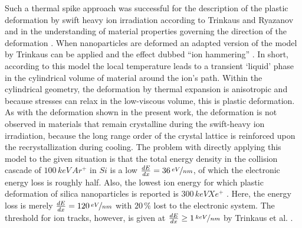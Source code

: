 Such a thermal spike approach was successful for the description of the plastic deformation by swift heavy ion irradiation according to Trinkaus and Ryazanov \cite{trinkaus_viscoelastic_1995} and in the understanding of material properties governing the direction of the deformation \cite{hedler_amorphous_2004,hedler_boundary_2005}. When nanoparticles are deformed \cite{snoeks_colloidal_2000,snoeks_colloidal_2001,van_dillen_anisotropic_2001,dillen_energy-dependent_2001,dillen_ion_2003,dillen_ion_2004} an adapted version of the model by Trinkaus can be applied and the effect dubbed ``ion hammering'' \cite{klaumunzer_ion_2004}. In short, according to this model the local temperature leads to a transient `liquid' phase in the cylindrical volume of material around the ion's path. Within the cylindrical geometry, the deformation by thermal expansion is anisotropic and because stresses can relax in the low-viscous volume, this is plastic deformation. As with the deformation shown in the present work, the deformation is not observed in materials that remain crystalline during the swift-heavy ion irradiation, because the long range order of the crystal lattice is reinforced upon the recrystallization during cooling. The problem with directly applying this model to the given situation is that the total energy density in the collision cascade of $100\,keV\,Ar^+$ in $Si$ is a low $\frac{dE}{dx} = 36\,\nicefrac{eV}{nm}$, of which the electronic energy loss is roughly half. Also, the lowest ion energy for which plastic deformation of silica nanoparticles is reported is $300\,keV Xe^+$ \cite{dillen_ion_2003}. Here, the energy loss is merely $\frac{dE}{dx} = 120\,\nicefrac{eV}{nm}$ with $20\,\%$ lost to the electronic system. The threshold for ion tracks, however, is given at $\frac{dE}{dx} \geq 1\,\nicefrac{keV}{nm}$ by Trinkaus et al. \cite{trinkaus_viscoelastic_1995}.


